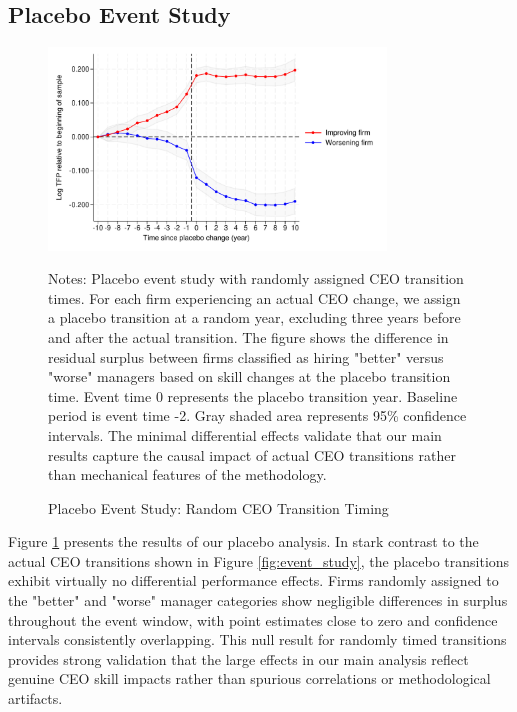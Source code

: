 \documentclass[11pt,a4paper]{article}
\begin{document}


\subsection{Placebo Event Study}

\begin{figure}[htbp]
\centering
\includegraphics[width=0.8\textwidth]{figure/placebo.pdf}
\caption{Placebo Event Study: Random CEO Transition Timing}
\label{fig:placebo}
\footnotesize
Notes: Placebo event study with randomly assigned CEO transition times. For each firm experiencing an actual CEO change, we assign a placebo transition at a random year, excluding three years before and after the actual transition. The figure shows the difference in residual surplus between firms classified as hiring "better" versus "worse" managers based on skill changes at the placebo transition time. Event time 0 represents the placebo transition year. Baseline period is event time -2. Gray shaded area represents 95\% confidence intervals. The minimal differential effects validate that our main results capture the causal impact of actual CEO transitions rather than mechanical features of the methodology.
\end{figure}

Figure \ref{fig:placebo} presents the results of our placebo analysis. In stark contrast to the actual CEO transitions shown in Figure \ref{fig:event_study}, the placebo transitions exhibit virtually no differential performance effects. Firms randomly assigned to the "better" and "worse" manager categories show negligible differences in surplus throughout the event window, with point estimates close to zero and confidence intervals consistently overlapping. This null result for randomly timed transitions provides strong validation that the large effects in our main analysis reflect genuine CEO skill impacts rather than spurious correlations or methodological artifacts.




\end{document}
